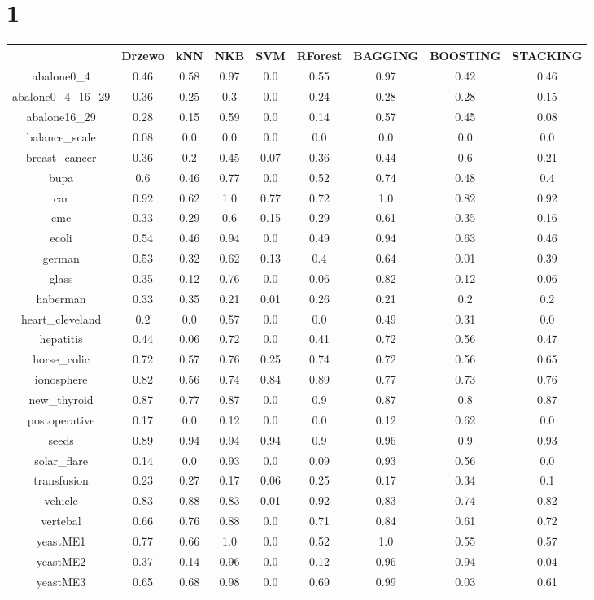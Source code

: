 \documentclass{article}%
\begin{document}
%
\section*{1}%
\begin{tabular}{|c|c|c|c|c|c|c|c|c|}%
\hline%
&Drzewo&kNN&NKB&SVM&RForest&BAGGING&BOOSTING&STACKING\\%
\hline%
abalone0\_4&0.46&0.58&0.97&0.0&0.55&0.97&0.42&0.46\\%
\hline%
abalone0\_4\_16\_29&0.36&0.25&0.3&0.0&0.24&0.28&0.28&0.15\\%
\hline%
abalone16\_29&0.28&0.15&0.59&0.0&0.14&0.57&0.45&0.08\\%
\hline%
balance\_scale&0.08&0.0&0.0&0.0&0.0&0.0&0.0&0.0\\%
\hline%
breast\_cancer&0.36&0.2&0.45&0.07&0.36&0.44&0.6&0.21\\%
\hline%
bupa&0.6&0.46&0.77&0.0&0.52&0.74&0.48&0.4\\%
\hline%
car&0.92&0.62&1.0&0.77&0.72&1.0&0.82&0.92\\%
\hline%
cmc&0.33&0.29&0.6&0.15&0.29&0.61&0.35&0.16\\%
\hline%
ecoli&0.54&0.46&0.94&0.0&0.49&0.94&0.63&0.46\\%
\hline%
german&0.53&0.32&0.62&0.13&0.4&0.64&0.01&0.39\\%
\hline%
glass&0.35&0.12&0.76&0.0&0.06&0.82&0.12&0.06\\%
\hline%
haberman&0.33&0.35&0.21&0.01&0.26&0.21&0.2&0.2\\%
\hline%
heart\_cleveland&0.2&0.0&0.57&0.0&0.0&0.49&0.31&0.0\\%
\hline%
hepatitis&0.44&0.06&0.72&0.0&0.41&0.72&0.56&0.47\\%
\hline%
horse\_colic&0.72&0.57&0.76&0.25&0.74&0.72&0.56&0.65\\%
\hline%
ionosphere&0.82&0.56&0.74&0.84&0.89&0.77&0.73&0.76\\%
\hline%
new\_thyroid&0.87&0.77&0.87&0.0&0.9&0.87&0.8&0.87\\%
\hline%
postoperative&0.17&0.0&0.12&0.0&0.0&0.12&0.62&0.0\\%
\hline%
seeds&0.89&0.94&0.94&0.94&0.9&0.96&0.9&0.93\\%
\hline%
solar\_flare&0.14&0.0&0.93&0.0&0.09&0.93&0.56&0.0\\%
\hline%
transfusion&0.23&0.27&0.17&0.06&0.25&0.17&0.34&0.1\\%
\hline%
vehicle&0.83&0.88&0.83&0.01&0.92&0.83&0.74&0.82\\%
\hline%
vertebal&0.66&0.76&0.88&0.0&0.71&0.84&0.61&0.72\\%
\hline%
yeastME1&0.77&0.66&1.0&0.0&0.52&1.0&0.55&0.57\\%
\hline%
yeastME2&0.37&0.14&0.96&0.0&0.12&0.96&0.94&0.04\\%
\hline%
yeastME3&0.65&0.68&0.98&0.0&0.69&0.99&0.03&0.61\\%
\hline%
\end{tabular}
\end{document}
